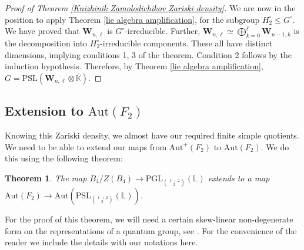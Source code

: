 \documentclass[letterpaper]{amsart}
\newtheorem{theorem}{Theorem}[section]
\begin{document}
\begin{proof}[Proof of Theorem \ref{Knizhinik Zamolodichikov Zariski density}]
We are now in the position to apply Theorem \ref{lie algebra amplification}, for the subgroup $H_2^\circ \leq G^\circ.$ We have proved that $\textbf{W}_{n, \ell}$ is $G^\circ$-irreducible. Further, $\textbf{W}_{n, \ell} \simeq \bigoplus_{k=0}^\ell \textbf{W}_{n-1, k}$ is the decomposition into $H_2^\circ$-irreducible components. These all have distinct dimensions, implying conditions 1, 3 of the theorem. Condition 2 follows by the induction hypothesis. Therefore, by Theorem \ref{lie algebra amplification}, $G = \mathrm{PSL}(\textbf{W}_{n,\ell} \otimes \overline{\mathbb{K}}).$
\end{proof}
\subsection{Extension to $\mathrm{Aut}(F_2)$}
Knowing this Zariski density, we almost have our required finite simple quotients. We need to be able to extend our maps from $\mathrm{Aut}^+(F_2)$ to $\mathrm{Aut}(F_2)$. We do this using the following theorem:
\begin{theorem}
    The map $B_4 / Z(B_4) \to \mathrm{PGL}_{\binom{\ell + 2}{2}}(\mathbb{L})$ extends to a map $\mathrm{Aut}(F_2) \to \mathrm{Aut}(\mathrm{PSL}_{\binom{\ell + 2}{2}}(\mathbb{L}))$.
\end{theorem}
For the proof of this theorem, we will need a certain skew-linear non-degenerate form on the representations of a quantum group, see \cite{wenzl1998C}. For the convenience of the reader we include the details with our notations here.
\end{document}
